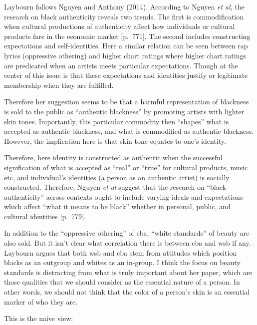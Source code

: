 \documentclass[
  letterpaper,
  DIV=11,
  numbers=noendperiod]{scrreprt}
\begin{document}
\begin{tcolorbox}[enhanced jigsaw, arc=.35mm, breakable, rightrule=.15mm, colback=white, colframe=quarto-callout-important-color-frame, bottomrule=.15mm, leftrule=.75mm, opacityback=0, toprule=.15mm, left=2mm]
\begin{tcolorbox}[enhanced jigsaw, arc=.35mm, breakable, rightrule=.15mm, colback=white, colframe=quarto-callout-tip-color-frame, bottomrule=.15mm, leftrule=.75mm, opacityback=0, toprule=.15mm, left=2mm]
Laybourn follows Nguyen and Anthony (2014). According to Nguyen \emph{et
al}, the research on black authenticity reveals two trends. The first is
commodification when cultural productions of authenticity affect how
individuals or cultural products fare in the economic market
{[}p.~771{]}. The second includes constructing expectations and
self-identities. Here a similar relation can be seen between rap lyrics
(oppressive othering) and higher chart ratings where higher chart
ratings are predicated when an artists meets particular expectations.
Though at the center of this issue is that these expectations and
identities justify or legitimate membership when they are fulfilled.

Therefore her suggestion seems to be that a harmful representation of
blackness is sold to the public as ``authentic blackness'' by promoting
artists with lighter skin tones. Importantly, this particular commodity
then ``shapes'' what is accepted as authentic blackness, and what is
commodified as authentic blackness. However, the implication here is
that skin tone equates to one's identity.

Therefore, here identity is constructed as authentic when the successful
signification of what is accepted as ``real'' or ``true'' for cultural
products, music etc, and individual's identities (a person as an
authentic artist) is socially constructed. Therefore, Nguyen \emph{et
al} suggest that the research on ``black authenticity'' across contexts
ought to include varying ideals and expectations which affect ``what it
means to be black'' whether in personal, public, and cultural identities
{[}p.~779{]}.

In addition to the ``oppressive othering'' of cba, ``white standards''
of beauty are also sold. But it isn't clear what correlation there is
between cba and wsb if any. Laybourn argues that both wsb and cba stem
from attitudes which position blacks as an outgroup and whites as an
in-group. I think the focus on beauty standards is distracting from what
is truly important about her paper, which are those qualities that we
should consider as the essential nature of a person. In other words, we
should not think that the color of a person's skin is an essential
marker of who they are.

This is the naive view:


\end{tcolorbox}
\end{tcolorbox}
\end{document}
